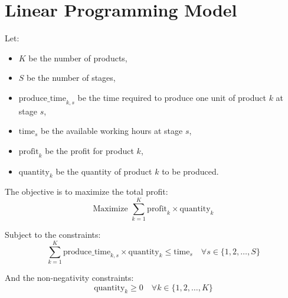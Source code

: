 \documentclass{article}
\begin{document}
\section*{Linear Programming Model}

Let:
\begin{itemize}
    \item \( K \) be the number of products,
    \item \( S \) be the number of stages,
    \item \( \text{produce\_time}_{k,s} \) be the time required to produce one unit of product \( k \) at stage \( s \),
    \item \( \text{time}_{s} \) be the available working hours at stage \( s \),
    \item \( \text{profit}_{k} \) be the profit for product \( k \),
    \item \( \text{quantity}_{k} \) be the quantity of product \( k \) to be produced.
\end{itemize}

The objective is to maximize the total profit:
\[
\text{Maximize } \sum_{k=1}^{K} \text{profit}_{k} \times \text{quantity}_{k}
\]

Subject to the constraints:
\[
\sum_{k=1}^{K} \text{produce\_time}_{k,s} \times \text{quantity}_{k} \leq \text{time}_{s} \quad \forall s \in \{1, 2, \ldots, S\}
\]

And the non-negativity constraints:
\[
\text{quantity}_{k} \geq 0 \quad \forall k \in \{1, 2, \ldots, K\}
\]
\end{document}
